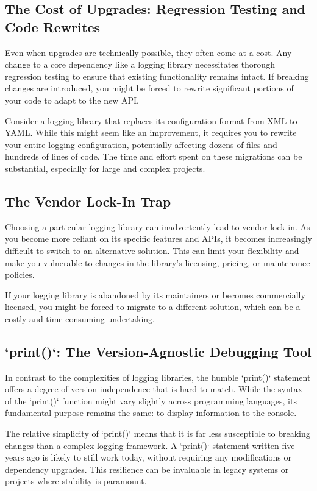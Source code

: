 \documentclass{article}
\begin{document}
{{{{\subsection*{The Cost of Upgrades: Regression Testing and Code Rewrites}

Even when upgrades are technically possible, they often come at a cost. Any change to a core dependency like a logging library necessitates thorough regression testing to ensure that existing functionality remains intact. If breaking changes are introduced, you might be forced to rewrite significant portions of your code to adapt to the new API.

Consider a logging library that replaces its configuration format from XML to YAML. While this might seem like an improvement, it requires you to rewrite your entire logging configuration, potentially affecting dozens of files and hundreds of lines of code. The time and effort spent on these migrations can be substantial, especially for large and complex projects.

\subsection*{The Vendor Lock-In Trap}

Choosing a particular logging library can inadvertently lead to vendor lock-in. As you become more reliant on its specific features and APIs, it becomes increasingly difficult to switch to an alternative solution. This can limit your flexibility and make you vulnerable to changes in the library's licensing, pricing, or maintenance policies.

If your logging library is abandoned by its maintainers or becomes commercially licensed, you might be forced to migrate to a different solution, which can be a costly and time-consuming undertaking.

\subsection*{`print()`: The Version-Agnostic Debugging Tool}

In contrast to the complexities of logging libraries, the humble `print()` statement offers a degree of version independence that is hard to match. While the syntax of the `print()` function might vary slightly across programming languages, its fundamental purpose remains the same: to display information to the console.

The relative simplicity of `print()` means that it is far less susceptible to breaking changes than a complex logging framework. A `print()` statement written five years ago is likely to still work today, without requiring any modifications or dependency upgrades. This resilience can be invaluable in legacy systems or projects where stability is paramount.

}}}}
\end{document}
